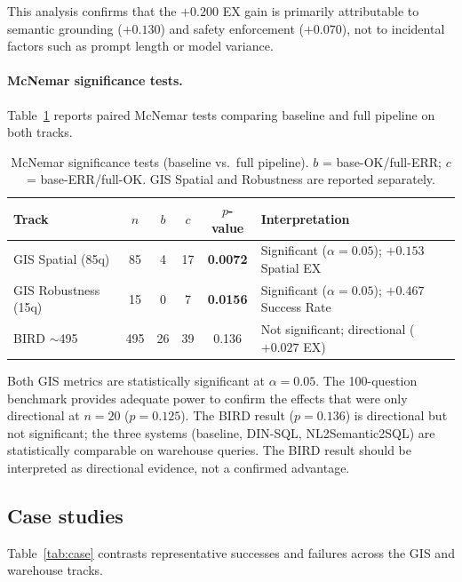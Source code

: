 \documentclass[11pt]{article}
\begin{document}
This analysis confirms that the $+0.200$ EX gain is primarily attributable to semantic grounding ($+0.130$) and safety enforcement ($+0.070$), not to incidental factors such as prompt length or model variance.

\paragraph{McNemar significance tests.}
Table~\ref{tab:mcnemar} reports paired McNemar tests comparing baseline and full pipeline on both tracks.

\begin{table}[t]
\centering
\footnotesize
\caption{McNemar significance tests (baseline vs.\ full pipeline). $b$ = base-OK/full-ERR; $c$ = base-ERR/full-OK. GIS Spatial and Robustness are reported separately.}
\label{tab:mcnemar}
\begin{tabular}{lccccp{4.5cm}}
\toprule
Track & $n$ & $b$ & $c$ & $p$-value & Interpretation \\
\midrule
GIS Spatial (85q)   & 85  & 4  & 17 & \textbf{0.0072} & Significant ($\alpha=0.05$); $+0.153$ Spatial EX \\
GIS Robustness (15q)& 15  & 0  & 7  & \textbf{0.0156} & Significant ($\alpha=0.05$); $+0.467$ Success Rate \\
BIRD $\sim$495      & 495 & 26 & 39 & 0.136 & Not significant; directional ($+0.027$ EX) \\
\bottomrule
\end{tabular}
\end{table}

Both GIS metrics are statistically significant at $\alpha=0.05$. The 100-question benchmark provides adequate power to confirm the effects that were only directional at $n=20$ ($p=0.125$). The BIRD result ($p=0.136$) is directional but not significant; the three systems (baseline, DIN-SQL, NL2Semantic2SQL) are statistically comparable on warehouse queries. The BIRD result should be interpreted as directional evidence, not a confirmed advantage.

\subsection{Case studies}

Table~\ref{tab:case} contrasts representative successes and failures across the GIS and warehouse tracks.
\end{document}
